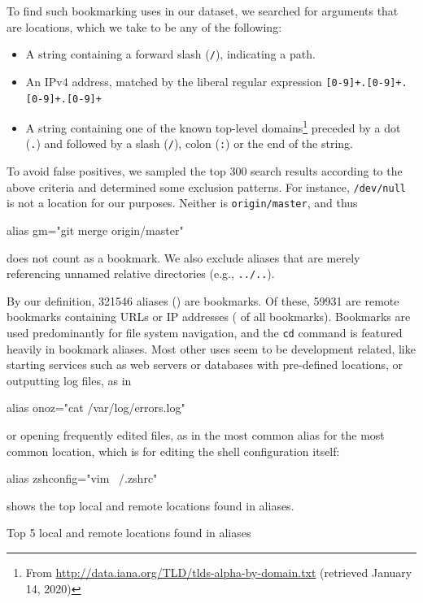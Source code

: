 To find such bookmarking uses in our dataset, we searched for arguments that are locations, which we take to be any of the following:
\begin{itemize}
    \item A string containing a forward slash (\verb|/|), indicating a path.
    \item An IPv4 address, matched by the liberal regular expression \verb|[0-9]+.[0-9]+.[0-9]+.[0-9]+|
    \item A string containing one of the known top-level domains\footnote{From \url{http://data.iana.org/TLD/tlds-alpha-by-domain.txt} (retrieved January 14, 2020)} preceded by a dot (\verb|.|) and followed by a slash (\verb|/|), colon (\verb|:|) or the end of the string.
\end{itemize}
To avoid false positives, we sampled the top 300 search results according to the above criteria and determined some exclusion patterns.
For instance, \texttt{/dev/null} is not a location for our purposes.
Neither is \texttt{origin/master}, and thus 
\begin{CVerbatim}
alias gm="git merge origin/master"
\end{CVerbatim}
does not count as a bookmark.
We also exclude aliases that are merely referencing unnamed relative directories (e.g., \verb|../..|).

By our definition, \num{321546} aliases () are bookmarks.
Of these, \num{59931} are remote bookmarks containing URLs or IP addresses ( of all bookmarks).
Bookmarks are used predominantly for file system navigation, and the \verb|cd| command is featured heavily in bookmark aliases.
Most other uses seem to be development related, like starting services such as web servers or databases with pre-defined locations,
or outputting log files, as in
\begin{CVerbatim}
alias onoz="cat /var/log/errors.log"
\end{CVerbatim}
or opening frequently edited files, as in the most common alias for the most common location, which is for editing the shell configuration itself:
\begin{CVerbatim}
alias zshconfig="vim ~/.zshrc"
\end{CVerbatim}
 shows the top local and remote locations found in aliases.

\begin{table}
    \caption{Top 5 local and remote locations found in aliases}
    \label{tab:locations}
    
\end{table}

